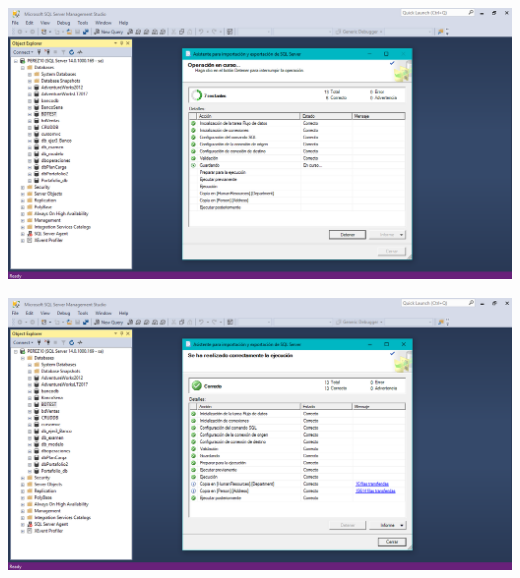 {\begin{center}
\end{center}
\begin{center}
\includegraphics[width=15cm]{./Imagenes/imagen11}
\end{center}
\begin{center}
\includegraphics[width=15cm]{./Imagenes/imagen12}
\end{center}
}

